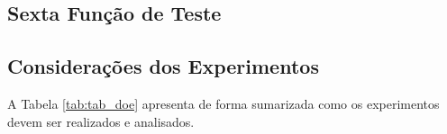 \subsection{Sexta Função de Teste}\label{sec:sexfun}



\subsection{Considerações dos Experimentos}
  A Tabela \ref{tab:tab_doe} apresenta de forma sumarizada como os experimentos devem ser realizados e analisados.
